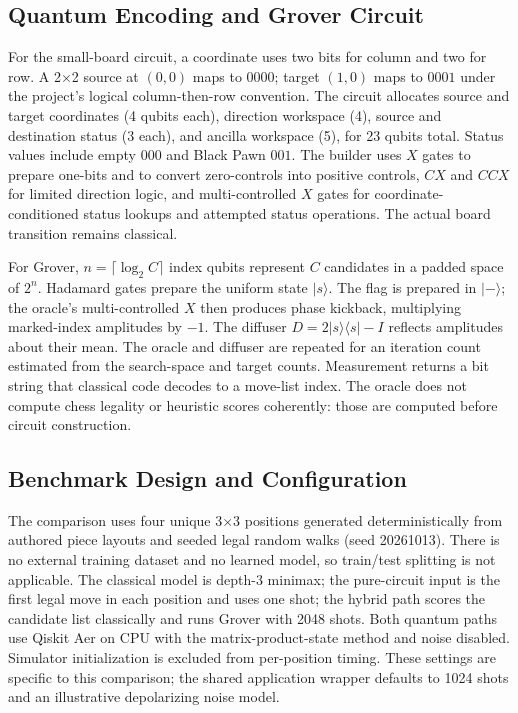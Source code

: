 \documentclass[conference]{IEEEtran}
\begin{document}
\subsection{Quantum Encoding and Grover Circuit}
For the small-board circuit, a coordinate uses two bits for column and two for row. A 2$\times$2 source at $(0,0)$ maps to $0000$; target $(1,0)$ maps to $0001$ under the project's logical column-then-row convention. The circuit allocates source and target coordinates (4 qubits each), direction workspace (4), source and destination status (3 each), and ancilla workspace (5), for 23 qubits total. Status values include empty $000$ and Black Pawn $001$. The builder uses $X$ gates to prepare one-bits and to convert zero-controls into positive controls, $CX$ and $CCX$ for limited direction logic, and multi-controlled $X$ gates for coordinate-conditioned status lookups and attempted status operations. The actual board transition remains classical.

For Grover, $n=\lceil\log_2 C\rceil$ index qubits represent $C$ candidates in a padded space of $2^n$. Hadamard gates prepare the uniform state $|s\rangle$. The flag is prepared in $|{-}\rangle$; the oracle's multi-controlled $X$ then produces phase kickback, multiplying marked-index amplitudes by $-1$. The diffuser $D=2|s\rangle\langle s|-I$ reflects amplitudes about their mean. The oracle and diffuser are repeated for an iteration count estimated from the search-space and target counts. Measurement returns a bit string that classical code decodes to a move-list index. The oracle does not compute chess legality or heuristic scores coherently: those are computed before circuit construction.

\subsection{Benchmark Design and Configuration}
The comparison uses four unique 3$\times$3 positions generated deterministically from authored piece layouts and seeded legal random walks (seed 20261013). There is no external training dataset and no learned model, so train/test splitting is not applicable. The classical model is depth-3 minimax; the pure-circuit input is the first legal move in each position and uses one shot; the hybrid path scores the candidate list classically and runs Grover with 2048 shots. Both quantum paths use Qiskit Aer on CPU with the matrix-product-state method and noise disabled. Simulator initialization is excluded from per-position timing. These settings are specific to this comparison; the shared application wrapper defaults to 1024 shots and an illustrative depolarizing noise model.
\end{document}
